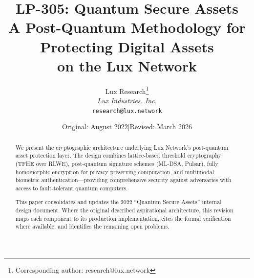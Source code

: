 \documentclass[11pt,a4paper]{article}
\title{LP-305: Quantum Secure Assets\\[4pt]
\large A Post-Quantum Methodology for Protecting Digital Assets\\
on the Lux Network}
\author{
Lux Research\thanks{Corresponding author: research@lux.network}\\
\textit{Lux Industries, Inc.}\\
\texttt{research@lux.network}
}
\date{Original: August 2022\quad|\quad Revised: March 2026}
\begin{document}
\luxcoverpage

\begin{abstract}
We present the cryptographic architecture underlying Lux Network's
post-quantum asset protection layer. The design combines lattice-based
threshold cryptography (TFHE over RLWE), post-quantum signature schemes
(ML-DSA, Pulsar), fully homomorphic encryption for privacy-preserving
computation, and multimodal biometric authentication---providing
comprehensive security against adversaries with access to fault-tolerant
quantum computers.

This paper consolidates and updates the 2022 ``Quantum Secure Assets''
internal design document. Where the original described aspirational
architecture, this revision maps each component to its production
implementation, cites the formal verification where available, and
identifies the remaining open problems.
\end{abstract}

\tableofcontents
\newpage









\end{document}
